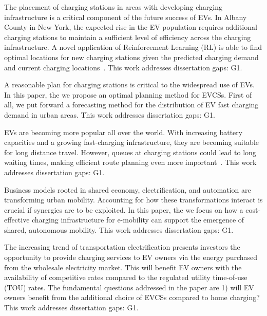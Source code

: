 \documentclass[letterpaper, 12pt, oneside, doublespacing]{Thesis}
\begin{document}
\noindent The placement of charging stations in areas with developing charging infrastructure is a critical component of the future success of EVs. In Albany County in New York, the expected rise in the EV population requires additional charging stations to maintain a sufficient level of efficiency across the charging infrastructure. A novel application of Reinforcement Learning (RL) is able to find optimal locations for new charging stations given the predicted charging demand and current charging locations~\cite{optimal_placement_2021}. This work addresses dissertation gaps: G1.



\noindent A reasonable plan for charging stations is critical to the widespread use of EVs. In this paper, the we \cite{optimal_planning_2021} propose an optimal planning method for EVCSs. First of all, we put forward a forecasting method for the distribution of EV fast charging demand in urban areas. This work addresses dissertation gaps: G1.



\noindent EVs are becoming more popular all over the world. With increasing battery capacities and a growing fast-charging infrastructure, they are becoming suitable for long distance travel. However, queues at charging stations could lead to long waiting times, making efficient route planning even more important~\cite{reducing_waiting_2021}. This work addresses dissertation gaps: G1.



\noindent Business models rooted in shared economy, electrification, and automation are transforming urban mobility. Accounting for how these transformations interact is crucial if synergies are to be exploited. In this paper, the we \cite{siting_and_2021} focus on how a cost-effective charging infrastructure for e-mobility can support the emergence of shared, autonomous mobility. This work addresses dissertation gaps: G1.



\noindent The increasing trend of transportation electrification presents investors the opportunity to provide charging services to EV owners via the energy purchased from the wholesale electricity market. This will benefit EV owners with the availability of competitive rates compared to the regulated utility time-of-use (TOU) rates. The fundamental questions addressed in the paper \cite{strategic_competition_2021} are 1) will EV owners benefit from the additional choice of EVCSs compared to home charging? This work addresses dissertation gaps: G1.
\end{document}
